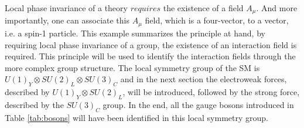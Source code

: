 Local phase invariance of a theory $requires$ the existence of a field $A_{\mu}$. 
And more importantly, one can associate this $A_{\mu}$ field, which is a four-vector, to a vector, i.e. a spin-1 particle. 
This example summarizes the principle at hand, by requiring local phase invariance of a group, the existence of an interaction field is required. 
This principle will be used to identify the interaction fields through the more complex group structure. 
\newline
The local symmetry group of the SM is $U(1)_{Y}\otimes SU(2)_{L}\otimes SU(3)_{C}$ and in the next section the electroweak forces, described by $U(1)_{Y}\otimes SU(2)_{L}$, will be introduced, followed by the strong force, described by the $SU(3)_{C}$ group. 
In the end, all the gauge bosons introduced in Table \ref{tab:bosons} will have been identified in this local symmetry group. 
